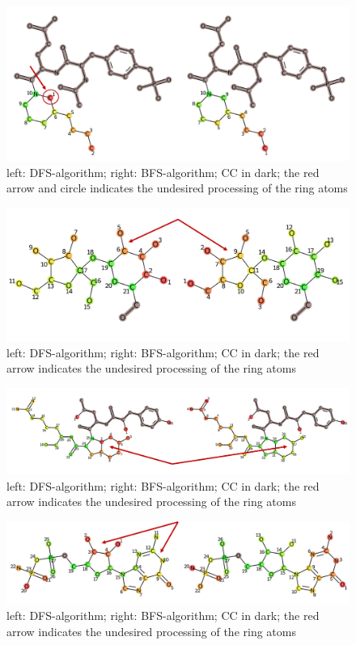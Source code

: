 \begin{figure}
\includegraphics[scale=1.3]{simple_ring_exampledfs3}\caption{left: DFS-algorithm; right: BFS-algorithm; CC in dark; the
red arrow and circle indicates the undesired processing of the ring
atoms}
\label{fig:simple_ring_exampledfs3}
\end{figure}
\begin{figure}

\includegraphics[scale=0.5]{simple_ring_exampledfs4}\caption{left: DFS-algorithm; right: BFS-algorithm; CC in dark; the
red arrow indicates the undesired processing of the ring atoms}
\label{fig:simple_ring_exampledfs4}
\end{figure}

\begin{figure}

\includegraphics[scale=0.5]{2ring_example}\caption{left: DFS-algorithm; right: BFS-algorithm; CC in dark; the
red arrow indicates the undesired processing of the ring atoms}
\label{fig:2ring_example}
\end{figure}

\begin{figure}

\includegraphics[scale=0.5]{2ring_example2}\caption{left: DFS-algorithm; right: BFS-algorithm; CC in dark; the
red arrow indicates the undesired processing of the ring atoms}
\label{fig:2ring_example2}
\end{figure}
